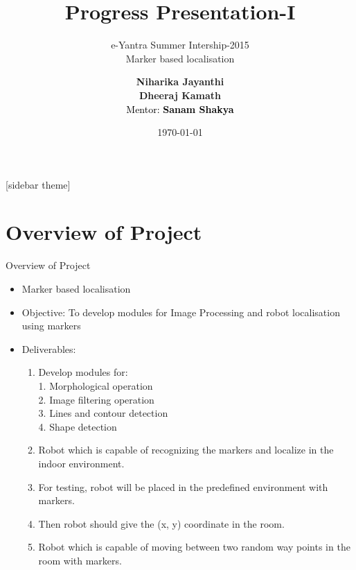 \documentclass[10pt, a4paper]{beamer}
\begin{document}
	\title{Progress Presentation-I}
	\subtitle{e-Yantra Summer Intership-2015 \\ Marker based localisation }
	\author{\textbf{Niharika Jayanthi}\\ \textbf{Dheeraj Kamath}\\
	\textcolor{black}{Mentor: \textbf{Sanam Shakya}}}
	\date{\today}
	\frame{\titlepage}

[sidebar theme]
\section{Overview of Project}
\begin{frame}{Overview of Project}

	\begin{itemize}
		\pause
		\item  Marker based localisation
		\pause
		\item Objective: To develop modules for Image Processing and robot localisation using markers
		\pause
		\item Deliverables:\begin{enumerate}
			\item Develop modules for: \\
			      1. Morphological operation \\
			      2. Image filtering operation \\
			      3. Lines and contour detection \\
			      4. Shape detection
			\pause
			\item 	Robot which is capable of recognizing the markers and localize in the indoor environment. 
			\pause
			\item   For testing, robot will be placed in the predefined environment with markers. 
			\pause
			\item Then robot should give the (x, y) coordinate in the room.
			\pause
			\item 	Robot which is capable of moving between two random way points in the room with markers.
		 	
		                     \end{enumerate}
	\end{itemize}
\end{frame}
\end{document}
